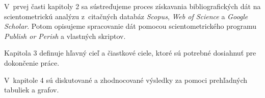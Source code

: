 V~prvej časti kapitoly 2 sa sústreďujeme  proces získavania bibliografických
dát na scientometrickú analýzu z~citačných databáz \emph{Scopus}, \emph{Web of
Science} a \emph{Google Scholar}.  Potom opisujeme spracovanie dát pomocou
scientometrického programu \emph{Publish or Perish} a vlastných skriptov.

Kapitola 3 definuje hľavný cieľ a čiastkové ciele, ktoré sú potrebné dosiahnuť
pre dokončenie práce.

V~kapitole 4 sú diskutované a zhodnocované  výsledky za pomoci prehľadných
tabuliek a grafov.

